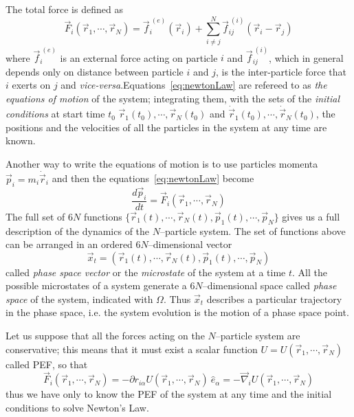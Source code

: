 The total force is defined as
\begin{equation*}
	\vec F_i(\vec r_1,\cdots,\vec r_N) = \vec{f}_i^{\ (e)}(\vec r_i) + \sum_{i\ne j}^N \vec{f}_{ij}^{\ (i)}(\vec r_i - \vec r_j )
\end{equation*}
where $\vec{f}_i^{\ (e)}$ is an external force acting on particle $i$ and $\vec{f}_{ij}^{\ (i)}$, which in general
depends only on distance between particle $i$ and $j$, is the inter-particle force that $i$ exerts on $j$ and
\textit{vice-versa}.Equations~\eqref{eq:newtonLaw} are refereed to as \textit{the equations of motion} of the
system; integrating them, with the sets of the \textit{initial conditions} at start time $t_0$ $\vec r_1(t_0),\cdots,\vec r_N(t_0)$ and $\dot{\vec{r}}_1(t_0),\cdots,\dot{\vec{r}}_N(t_0)$, the positions and the
velocities of all the particles in the system at any time are known.

Another way to write the equations of motion is to use particles momenta $\vec p_i = m_i \dot{\vec{r}}_i$ and then
the equations~\eqref{eq:newtonLaw} become
\begin{equation}
	\frac{d\vec p_i}{dt} = \vec F_i(\vec r_1,\cdots,\vec r_N)
	\label{eq:newtonLawMom}
\end{equation}
The full set of $6N$ functions $\{\vec r_1(t),\cdots,\vec r_N(t),\vec p_1(t),\cdots,\vec p_N\}$ gives us a full
description of the dynamics of the $N$--particle system. The set of functions above can be arranged in an ordered $6N$--dimensional vector
\begin{equation}
	\vec x_t = (\vec r_1(t),\cdots,\vec r_N(t),\vec p_1(t),\cdots,\vec p_N)
	\label{eq:phSpaceVector}
\end{equation}
called \textit{phase space vector} or the \textit{microstate} of the system at a time $t$. All the possible
microstates of a system generate a $6N$--dimensional space called \textit{phase space} of the system, indicated with $\Omega$. Thus $\vec x_t$ describes a particular trajectory in the phase space, i.e. the system evolution is the
motion of a phase space point.

Let us suppose that all the forces acting on the $N$--particle system are conservative; this means that it must
exist a scalar function $U = U(\vec r_1, \cdots, \vec r_N)$ called \ac{PEF}, so that
\begin{equation}
	\vec F_i(\vec r_1, \cdots, \vec r_N) = -\partial r_{i\alpha}U(\vec r_1, \cdots, \vec r_N)\ \hat e_\alpha = -\vec\nabla_i U(\vec r_1, \cdots, \vec r_N)
	\label{eq:pefForces}
\end{equation}
thus we have only to know the \ac{PEF} of the system at any time and the initial conditions to solve Newton's Law.

